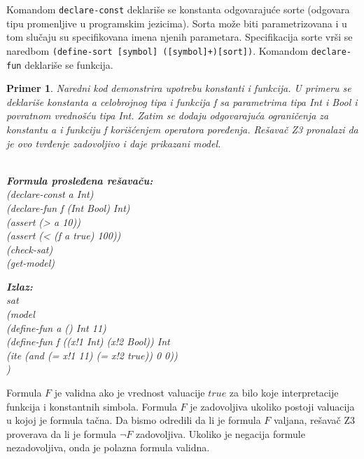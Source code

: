 \documentclass[12pt,oneside]{memoir}
\newcommand\tab[1][0.5cm]{\hspace*{#1}}
\newtheorem{primer}{Primer}
\begin{document}

Komandom \texttt{declare-const} deklariše se konstanta odgovarajuće sorte (odgovara tipu promenljive u programskim jezicima). Sorta može biti parametrizovana i u tom slučaju su specifikovana imena njenih parametara. Specifikacija sorte vrši se naredbom \texttt{(define-sort [symbol] ([symbol]+)[sort])}.
Komandom \texttt{declare-fun} deklariše se funkcija. 


\begin{primer} Naredni kod demonstrira upotrebu konstanti i funkcija. U primeru se deklariše konstanta a celobrojnog tipa i funkcija f sa parametrima tipa Int i Bool i povratnom vrednošću tipa Int. Zatim se dodaju odgovarajuća ograničenja za konstantu a i funkciju f korišćenjem operatora poređenja. Rešavač Z3 pronalazi da je ovo tvrđenje zadovoljivo i daje prikazani model. 
\\ \\

\hspace{-0.7cm}
\begin{minipage}[b]{0.43\textwidth}
\textbf{Formula prosleđena rešavaču:}\\
(declare-const a Int)\\
(declare-fun f (Int Bool) Int)\\
(assert (> a 10))\\
(assert (< (f a true) 100))\\
(check-sat)\\
(get-model) \\
\end{minipage}
\hspace{0.6cm}
\begin{minipage}[t]{0.5\textwidth}
\vspace{-4.715cm}
\textbf{Izlaz:}
\\sat 
\\(model 
\\\tab(define-fun a () Int 11) 
\\\tab(define-fun f ((x!1 Int) (x!2 Bool)) Int 
\\\tab(ite (and (= x!1 11) (= x!2 true)) 0 0))
\\)
\end{minipage}
\end{primer}


Formula $F$ je validna ako je vrednost valuacije $true$ za bilo koje interpretacije funkcija i konstantnih simbola. Formula $F$ je zadovoljiva ukoliko postoji valuacija u kojoj je formula tačna. Da bismo odredili da li je formula $F$ valjana, rešavač Z3 proverava da li je formula $\lnot F$ zadovoljiva. Ukoliko je negacija formule nezadovoljiva, onda je polazna formula validna. 
\end{document}
